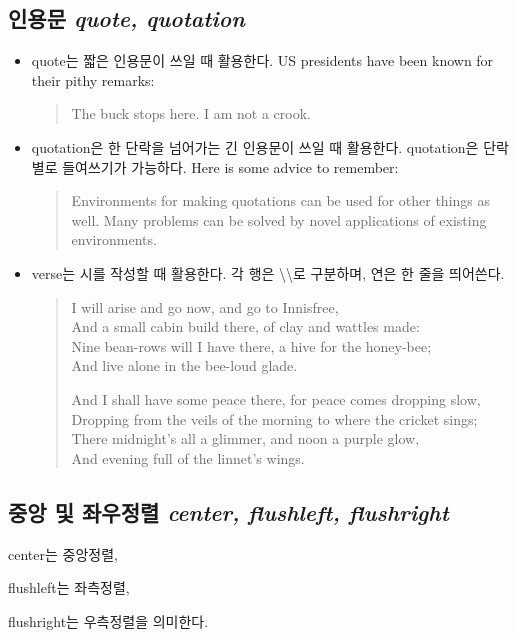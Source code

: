 \documentclass[a4paper, titlepage]{article}
\begin{document}
\subsection{인용문 \emph{quote, quotation}}
\begin{itemize}
    \item [\textbf{quote}] quote는 짧은 인용문이 쓰일 때 활용한다. 
US presidents have been
known for their pithy remarks:
\begin{quote}
The buck stops here.
I am not a crook.
\end{quote}

    \item [\textbf{quotation}] quotation은 한 단락을 넘어가는 긴 인용문이 쓰일 때 활용한다. quotation은 단락별로 들여쓰기가 가능하다.
Here is some advice to remember:
\begin{quotation}
Environments for making quotations
can be used for other things as well.
Many problems can be solved by
novel applications of existing
environments.
\end{quotation}

    \item [\textbf{verse}] verse는 시를 작성할 때 활용한다. 각 행은 \textbackslash \textbackslash 로 구분하며, 연은 한 줄을 띄어쓴다.
\begin{verse}
I will arise and go now,
and go to Innisfree,\\
And a small cabin build there,
of clay and wattles made:\\
Nine bean-rows will I have there,
a hive for the honey-bee;\\
And live alone in the bee-loud glade.

And I shall have some peace there,
for peace comes dropping slow, \\
Dropping from the veils of the morning
to where the cricket sings; \\
There midnight's all a glimmer,
and noon a purple glow, \\
And evening full of the linnet's wings.
\end{verse}
\end{itemize}

\subsection{중앙 및 좌우정렬 \emph{center, flushleft, flushright}}
\begin{center}
    center는 중앙정렬, \\
\end{center} 
\begin{flushleft}
    flushleft는 좌측정렬, \\
\end{flushleft}
\begin{flushright}
    flushright는 우측정렬을 의미한다.
\end{flushright}
\end{document}
